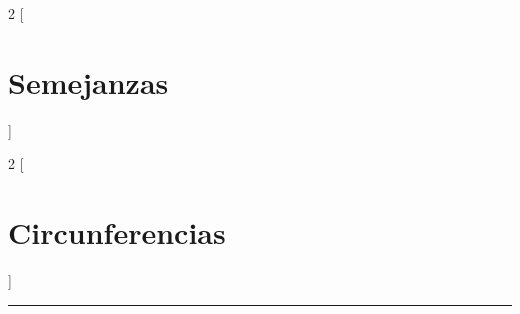 \documentclass[a4paper, ]{article}
\begin{document}
	\begin{multicols*}{2}
	[\section{Semejanzas}]
	\end{multicols*}\pagebreak
	
	\begin{multicols*}{2}
	[\section{Circunferencias}]
	\end{multicols*}\pagebreak
	
	
	 \noindent\rule{\linewidth}{0.4pt}
	 \doclicenseThis
	 
	 
	 
	 
	 
	 
	 
	 
	  	
 	
 	
 	
 	
 	
\end{document}
